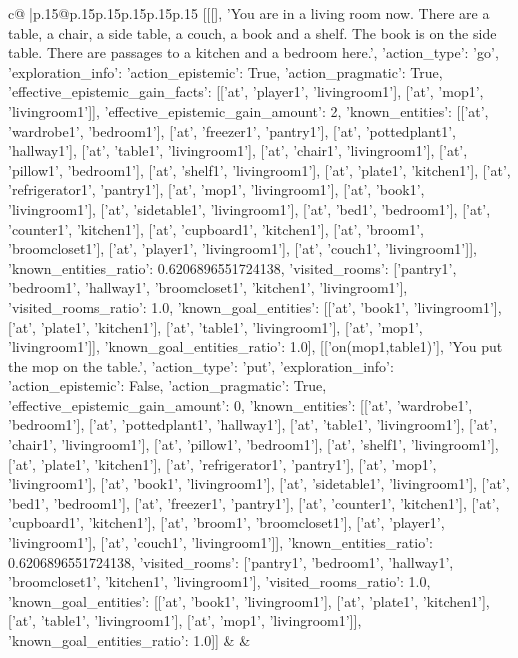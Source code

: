 \documentclass{article}
\begin{document}
{\begin{supertabular}{c@{$\;$}|p{.15\linewidth}@{}p{.15\linewidth}p{.15\linewidth}p{.15\linewidth}p{.15\linewidth}p{.15\linewidth}}
{{{	 [[[], 'You are in a living room now. There are a table, a chair, a side table, a couch, a book and a shelf. The book is on the side table. There are passages to a kitchen and a bedroom here.', {'action_type': 'go', 'exploration_info': {'action_epistemic': True, 'action_pragmatic': True, 'effective_epistemic_gain_facts': [['at', 'player1', 'livingroom1'], ['at', 'mop1', 'livingroom1']], 'effective_epistemic_gain_amount': 2, 'known_entities': [['at', 'wardrobe1', 'bedroom1'], ['at', 'freezer1', 'pantry1'], ['at', 'pottedplant1', 'hallway1'], ['at', 'table1', 'livingroom1'], ['at', 'chair1', 'livingroom1'], ['at', 'pillow1', 'bedroom1'], ['at', 'shelf1', 'livingroom1'], ['at', 'plate1', 'kitchen1'], ['at', 'refrigerator1', 'pantry1'], ['at', 'mop1', 'livingroom1'], ['at', 'book1', 'livingroom1'], ['at', 'sidetable1', 'livingroom1'], ['at', 'bed1', 'bedroom1'], ['at', 'counter1', 'kitchen1'], ['at', 'cupboard1', 'kitchen1'], ['at', 'broom1', 'broomcloset1'], ['at', 'player1', 'livingroom1'], ['at', 'couch1', 'livingroom1']], 'known_entities_ratio': 0.6206896551724138, 'visited_rooms': ['pantry1', 'bedroom1', 'hallway1', 'broomcloset1', 'kitchen1', 'livingroom1'], 'visited_rooms_ratio': 1.0, 'known_goal_entities': [['at', 'book1', 'livingroom1'], ['at', 'plate1', 'kitchen1'], ['at', 'table1', 'livingroom1'], ['at', 'mop1', 'livingroom1']], 'known_goal_entities_ratio': 1.0}}], [['on(mop1,table1)'], 'You put the mop on the table.', {'action_type': 'put', 'exploration_info': {'action_epistemic': False, 'action_pragmatic': True, 'effective_epistemic_gain_amount': 0, 'known_entities': [['at', 'wardrobe1', 'bedroom1'], ['at', 'pottedplant1', 'hallway1'], ['at', 'table1', 'livingroom1'], ['at', 'chair1', 'livingroom1'], ['at', 'pillow1', 'bedroom1'], ['at', 'shelf1', 'livingroom1'], ['at', 'plate1', 'kitchen1'], ['at', 'refrigerator1', 'pantry1'], ['at', 'mop1', 'livingroom1'], ['at', 'book1', 'livingroom1'], ['at', 'sidetable1', 'livingroom1'], ['at', 'bed1', 'bedroom1'], ['at', 'freezer1', 'pantry1'], ['at', 'counter1', 'kitchen1'], ['at', 'cupboard1', 'kitchen1'], ['at', 'broom1', 'broomcloset1'], ['at', 'player1', 'livingroom1'], ['at', 'couch1', 'livingroom1']], 'known_entities_ratio': 0.6206896551724138, 'visited_rooms': ['pantry1', 'bedroom1', 'hallway1', 'broomcloset1', 'kitchen1', 'livingroom1'], 'visited_rooms_ratio': 1.0, 'known_goal_entities': [['at', 'book1', 'livingroom1'], ['at', 'plate1', 'kitchen1'], ['at', 'table1', 'livingroom1'], ['at', 'mop1', 'livingroom1']], 'known_goal_entities_ratio': 1.0}}]] 
	  } 
	   } 
	   } 
	 & & \\ 
 


\end{supertabular}}
\end{document}
